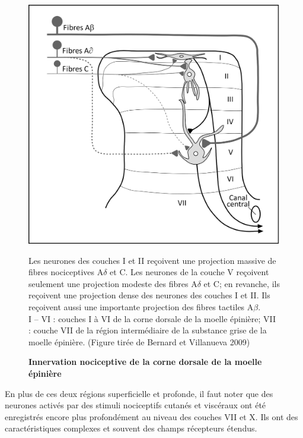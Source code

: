\documentclass[a4paper,12pt,twoside]{report}
\begin{document}
\begin{figure}[!h]

\begin{center}
 \includegraphics{Figure1.jpg} 
\end{center}

\caption{\textbf{Innervation nociceptive de la corne dorsale de la moelle épinière}}

{\protect\parbox[t]{18cm}{
\begin{small}Les neurones des couches I et II reçoivent une projection massive de fibres nociceptives A$\delta$ et C. Les neurones de la couche V reçoivent seulement une projection modeste des fibres A$\delta$ et C; en revanche, ils reçoivent une projection dense des neurones des couches I et II. Ils reçoivent aussi une importante projection des fibres tactiles A$\beta$.\\
I – VI : couches I à VI de la corne dorsale de la moelle épinière; VII : couche VII de la région intermédiaire de la substance grise de la moelle épinière. (Figure tirée de Bernard et Villanueva 2009) \end{small}}}

\label{Figure 1}

\end{figure}


En plus de ces deux régions superficielle et profonde, il faut noter que des neurones activés par des stimuli nociceptifs cutanés et viscéraux ont été enregistrés encore plus profondément au niveau des couches VII et X. Ils ont des caractéristiques complexes et souvent des champs récepteurs étendus.
\end{document}
